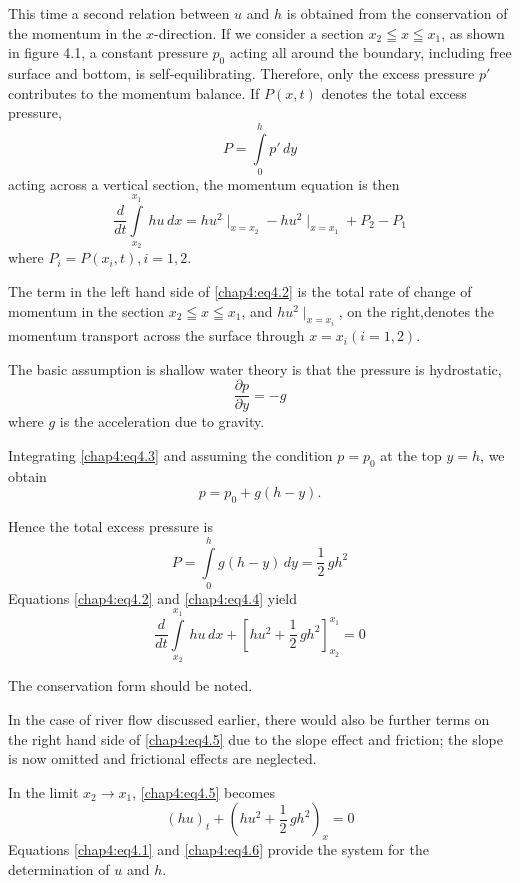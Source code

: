 This time a second relation between $u$ and $h$ is obtained from the conservation of the momentum in the $x$-direction. If we consider a section $x_2\leqq x\leqq x_1$, as shown in figure 4.1, a constant pressure $p_0$ acting all around the boundary, including free surface and bottom, is self-equilibrating. Therefore, only the excess pressure $p'$ contributes to the momentum balance. If $P(x,t)$ denotes the total excess pressure,
$$
P=\int\limits_0^h p'\,dy
$$
acting across a vertical section, the momentum equation is then
\begin{equation}
\frac{d}{dt}\int\limits_{x_2}^{x_1}\,hu \, dx =hu^2\mid_{x=x_2}-hu^2 \mid_{x=x_1} +P_2-P_1\tag{4.2}\label{chap4:eq4.2}
\end{equation}
where $P_i=P\left(x_i,t\right), i=1,2$.

The term in the left hand side of \eqref{chap4:eq4.2} is the total rate of change of momentum in the section $x_2\leqq x\leqq x_1$, and $hu^2\mid_{x=x_i}$, on the right,\pageoriginale denotes the momentum transport across the surface through $x=x_i(i=1,2)$. 

The basic assumption is shallow water theory is that the pressure is hydrostatic, \ie
\begin{equation}
\frac{\partial p}{\partial y}=-g\tag{4.3}\label{chap4:eq4.3}
\end{equation}
where $g$ is the acceleration due to gravity.

Integrating \eqref{chap4:eq4.3} and assuming the condition $p=p_0$ at the top $y=h$, we obtain
$$
p=p_0+g(h-y).
$$

Hence the total excess pressure is 
\begin{equation}
P=\int\limits_0^hg(h-y)\,dy =\frac{1}{2}\,gh^2\tag{4.4}\label{chap4:eq4.4}
\end{equation}
Equations \eqref{chap4:eq4.2} and \eqref{chap4:eq4.4} yield
\begin{equation}
\frac{d}{dt}\int\limits_{x_2}^{x_1}\,hu\,dx +\left[hu^2+\frac{1}{2}\,gh^2 \right]_{x_2}^{x_1}=0\tag{4.5}\label{chap4:eq4.5}
\end{equation}

The conservation form should be noted.

In the case of river flow discussed earlier, there would also be further terms on the right hand side of \eqref{chap4:eq4.5} due to the slope effect and friction; the slope is now omitted and frictional effects are neglected.

In the limit $x_2\to x_1$, \eqref{chap4:eq4.5} becomes 
\begin{equation}
(hu)_t+\left(hu^2+\frac{1}{2}\,gh^2\right)_x=0\tag{4.6}\label{chap4:eq4.6}
\end{equation}
Equations \eqref{chap4:eq4.1} and \eqref{chap4:eq4.6} provide the system for the determination of $u$ and $h$.

